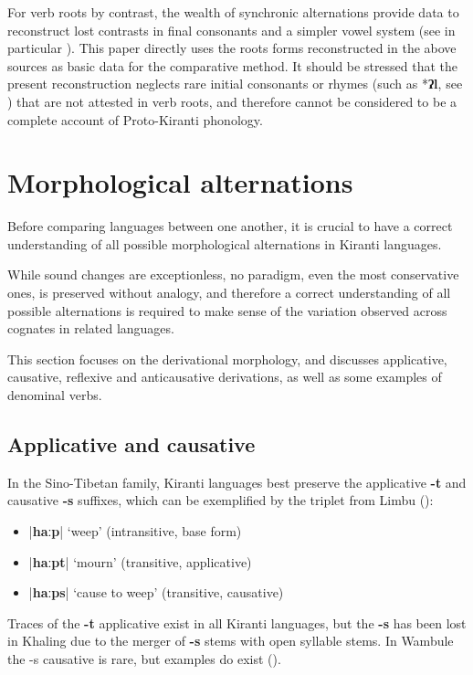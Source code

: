 \documentclass[oldfontcommands,oneside,a4paper,11pt]{article}
\newcommand{\ipa}[1]{\textbf{{\phon\mbox{#1}}}} %
\newcommand{\dhatu}[2]{|\ipa{#1}| `#2'}
\begin{document}
For verb roots by contrast, the wealth of synchronic alternations provide data to reconstruct lost contrasts in final consonants and a simpler vowel system (see in particular \citealt{michailovsky02dico, jacques12khaling, michailovsky12dumi}). This paper directly uses the roots forms reconstructed in the above sources as basic data for the comparative method. It should be stressed that the present reconstruction neglects rare initial consonants or rhymes (such as *\ipa{ʔl}, see \citealt{opgenort04implosives}) that are not attested in verb roots, and therefore cannot be considered to be a complete account of Proto-Kiranti phonology.


\section{Morphological alternations} \label{sec:alternations}
Before comparing languages between one another, it is crucial to have a correct understanding of all possible morphological alternations in Kiranti languages. 

While sound changes are exceptionless, no paradigm, even the most conservative ones, is preserved without analogy, and therefore a correct understanding of all possible alternations is required to make sense of the variation observed across cognates in related languages.

This section focuses on the derivational morphology, and discusses applicative, causative, reflexive and anticausative derivations,  as well as some examples of denominal verbs.

\subsection{Applicative and causative} \label{sec:appl}
In the Sino-Tibetan family, Kiranti languages best preserve the applicative \ipa{-t} and causative \ipa{-s} suffixes, which can be exemplified by the triplet from Limbu (\citealt{michailovsky85dental}):

\begin{itemize}
\item  \dhatu{haːp}{weep} (intransitive, base form)
\item  \dhatu{haːpt}{mourn} (transitive, applicative)
\item  \dhatu{haːps}{cause to weep} (transitive, causative)
\end{itemize}

Traces of the \ipa{-t} applicative exist in all Kiranti languages, but the \ipa{-s} has been lost in Khaling due to the merger of \ipa{-s} stems with open syllable stems.  In Wambule the -s causative is rare, but examples do exist (\citealt[270-1]{opgenort04wambule}).
\end{document}
